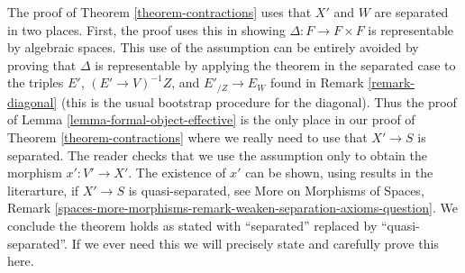 \begin{remark}
\label{remark-separated-needed}
The proof of Theorem \ref{theorem-contractions} uses that $X'$ and $W$
are separated in two places. First, the proof uses this in showing
$\Delta : F \to F \times F$ is representable by algebraic spaces.
This use of the assumption can be entirely avoided by proving
that $\Delta$ is representable by applying the theorem in the
separated case to the triples
$E'$, $(E' \to V)^{-1}Z$, and $E'_{/Z} \to E_W$
found in Remark \ref{remark-diagonal} (this is the usual bootstrap
procedure for the diagonal). Thus the proof of
Lemma \ref{lemma-formal-object-effective} is the only
place in our proof of Theorem \ref{theorem-contractions}
where we really need to use that $X' \to S$ is separated.
The reader checks that we use the assumption only to obtain
the morphism $x' : V' \to X'$. The existence of $x'$ can be shown,
using results in the literarture, if $X' \to S$ is quasi-separated, see
More on Morphisms of Spaces, Remark
\ref{spaces-more-morphisms-remark-weaken-separation-axioms-question}.
We conclude the theorem holds as stated with
``separated'' replaced by ``quasi-separated''. If we ever need this
we will precisely state and carefully prove this here.
\end{remark}





















